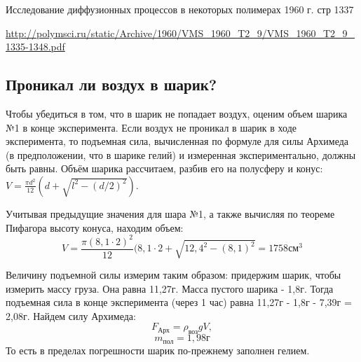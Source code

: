 \documentclass[12pt,a4paper]{article}
\begin{document}
    Исследование диффузионных процессов в некоторых полимерах 1960 г. стр 1337
    
    \url{http://polymsci.ru/static/Archive/1960/VMS_1960_T2_9/VMS_1960_T2_9_1335-1348.pdf}
    \subsection{Проникал ли воздух в шарик?}
        Чтобы убедиться в том, что в шарик не попадает воздух, оценим объем шарика №1 в конце эксперимента. Если воздух не проникал в шарик в ходе эксперимента, то подъемная сила, вычисленная по формуле для силы Архимеда (в предположении, что в шарике гелий) и измеренная экспериментально, должны быть равны. Объём шарика рассчитаем, разбив его на полусферу и конус: $V = \frac{\pi d^2}{12}(d + \sqrt{l^2 - (d/2)^2})$.
       
        Учитывая предыдущие значения для шара №1, а также вычисляя по теореме Пифагора высоту конуса, находим объем:
        \[
        V = \frac{\pi (8,1 \cdot 2)^2}{12} (8,1\cdot2 + \sqrt{12,4^2-(8,1)^2} = 1758 \text{см}^3
        \]
       
        Величину подъемной силы измерим таким образом: придержим шарик, чтобы измерить массу груза. Она равна 11,27г. Масса пустого шарика - 1,8г. Тогда подъемная сила в конце эксперимента (через 1 час) равна 11,27г - 1,8г - 7,39г = 2,08г. Найдем силу Архимеда:
        \[
        F_\text{Арх} = \rho_\text{воз} g V, 
        \]
        \[
        m_\text{пол} = 1,98 \text{г}
        \]
        То есть в пределах погрешности шарик по-прежнему заполнен гелием.
        
    \newpage
\end{document}
